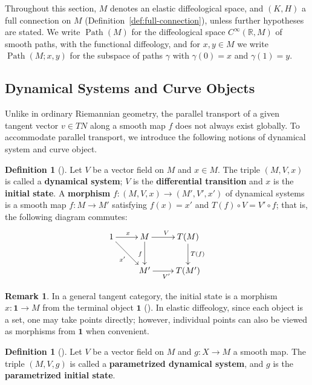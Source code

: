 \documentclass{amsart}
\newcommand{\R}{\mathbb{R}}
\DeclareMathOperator{\Path}{Path}
\theoremstyle{definition}
\newtheorem{defn}[thm]{Definition}
\newtheorem{rem}[thm]{Remark}
\begin{document}
Throughout this section, $M$ denotes an elastic diffeological space, and
$(K, H)$ a full connection on $M$ (Definition~\ref{def:full-connection}),
unless further hypotheses are stated. We write $\Path(M)$ for the
diffeological space $C^\infty(\R, M)$ of smooth paths, with the functional
diffeology, and for $x, y \in M$ we write $\Path(M; x, y)$ for the
subspace of paths $\gamma$ with $\gamma(0) = x$ and $\gamma(1) = y$.

\subsection{Dynamical Systems and Curve Objects}\label{subsec:parallel-transport}

Unlike in ordinary Riemannian geometry, the parallel transport of a given tangent
vector $v \in TN$ along a smooth map $f$ does not always exist globally.
To accommodate parallel transport, we introduce the following notions of
dynamical system and curve object.

\begin{defn}[{\cite[Definition~2.24]{CCL}}]\label{def:dynamical-system}
  Let $V$ be a vector field on $M$ and $x \in M$.
  The triple $(M, V, x)$ is called a \textbf{dynamical system};
  $V$ is the \textbf{differential transition} and $x$ is the \textbf{initial state}.
  A \textbf{morphism} $f \colon (M, V, x) \to (M', V', x')$ of dynamical systems
  is a smooth map $f \colon M \to M'$ satisfying $f(x) = x'$ and
  $T(f) \circ V = V' \circ f$; that is, the following diagram commutes:
  \[ \xymatrix{1 \ar[r]^x \ar[dr]_{x'} & M \ar[d]_f \ar[r]^V & T(M) \ar[d]^{T(f)} \\
               & M' \ar[r]_{V'} & T(M') } \]
\end{defn}

\begin{rem}\label{rem:initial-state}
  In a general tangent category, the initial state is a morphism
  $x \colon \mathbf{1} \to M$ from the terminal object $\mathbf{1}$
  (\cite[Definition~2.24]{CCL}).
  In elastic diffeology, since each object is a set, one may take points directly;
  however, individual points can also be viewed as morphisms from $\mathbf{1}$
  when convenient.
\end{rem}

\begin{defn}[{\cite[Definition~3.1]{CCL}}]\label{def:parametrized-dynamical-system}
  Let $V$ be a vector field on $M$ and $g \colon X \to M$ a smooth map.
  The triple $(M, V, g)$ is called a \textbf{parametrized dynamical system},
  and $g$ is the \textbf{parametrized initial state}.
\end{defn}
\end{document}
